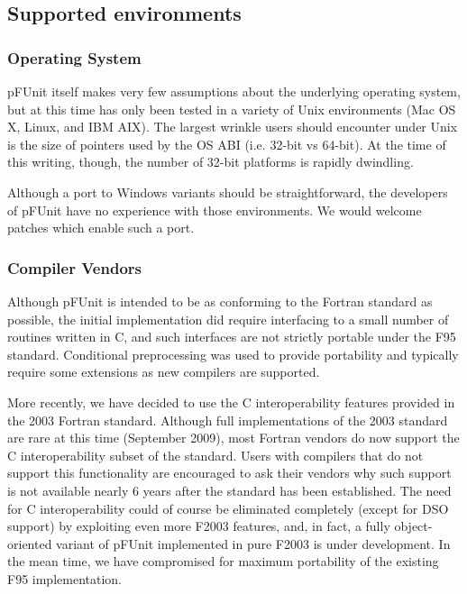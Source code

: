 \documentclass[10pt]{article}
\newcommand{\pfunit}{{\sc pFUnit }}
\begin{document}
\subsection{Supported environments}
\subsubsection{Operating System}

\pfunit itself makes very few assumptions about the underlying
operating system, but at this time has only been tested in a variety
of Unix environments  (Mac OS X, Linux, and IBM AIX).
The largest wrinkle users should encounter under Unix is the size of
pointers used by the OS ABI (i.e. 32-bit vs 64-bit).  At the time of
this writing, though, the number of 32-bit platforms is rapidly
dwindling.

Although a port to Windows variants should be straightforward, the
developers of \pfunit have no experience with those environments.  We
would welcome patches which enable such a port.

\subsubsection{Compiler Vendors}

Although \pfunit is intended to be as conforming to the Fortran
standard as possible, the initial implementation did require
interfacing to a small number of routines written in C, and such
interfaces are not strictly portable under the F95 standard.
Conditional preprocessing was used to provide portability and
typically require some extensions as new compilers are supported.

More recently, we have decided to use the C interoperability features
provided in the 2003 Fortran standard.  Although full implementations
of the 2003 standard are rare at this time (September 2009), most
Fortran vendors do now support the C interoperability subset of the
standard.  Users with compilers that do not support this
functionality are encouraged to ask their vendors why such support is
not available nearly 6 years after the standard has been established.
The need for C interoperability could of course be eliminated
completely (except for DSO support) by exploiting even more F2003
features, and, in fact, a fully object-oriented variant of \pfunit
implemented in pure F2003 is under development.  In the mean time, we
have compromised for maximum portability of the existing F95
implementation.\\
\end{document}
